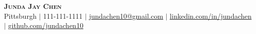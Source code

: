 
\begin{center}
    \textbf{\Huge \scshape Junda Jay Chen} \\ \vspace{1pt}
    \small Pittsburgh $|$ 111-111-1111 $|$ \href{mailto:x@x.com}{\underline{jundachen10@gmail.com}} $|$ 
    \href{https://linkedin.com/in/jundachen}{\underline{linkedin.com/in/jundachen}} $|$
    \href{https://github.com/jundachen10}{\underline{github.com/jundachen10}}
\end{center}